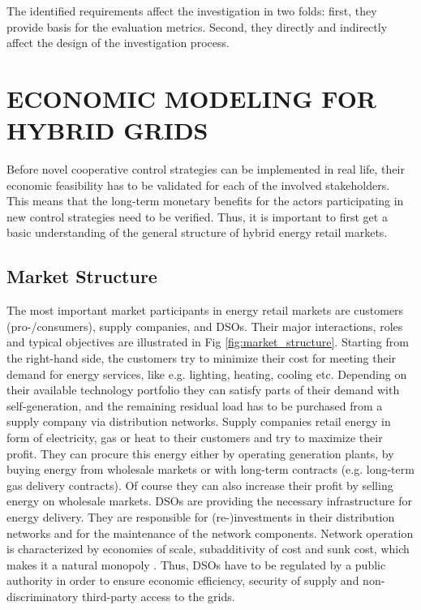 \documentclass[a4paper,twoside]{article}
\begin{document}
The identified requirements affect the investigation in two folds:
first, they provide basis for the evaluation metrics. Second, they
directly and indirectly affect the design of the investigation
process. 

     
\section{\uppercase{Economic Modeling for Hybrid Grids}}
\label{sec:econ} 
\noindent
Before novel cooperative control strategies can be implemented in real
life, their economic feasibility has to be validated for each of the
involved stakeholders. This means that the long-term monetary benefits
for the actors participating in new control strategies need to be
verified. Thus, it is important to first get a basic
understanding of the general structure of hybrid energy retail
markets.

\subsection{Market Structure}
\label{sec:econ-1}
\noindent
The most important market participants in energy retail markets are
customers (pro-/consumers), supply companies, and DSOs. Their
major interactions, roles and typical objectives are illustrated in
Fig  \ref{fig:market_structure}. 
Starting from the right-hand side, the customers try to minimize their
cost for meeting their demand for energy services, like e.g. lighting,
heating, cooling etc. Depending on their available technology
portfolio they can satisfy parts of their demand with self-generation,
and the remaining residual load has to be purchased from a supply
company via distribution networks. 
Supply companies retail energy in form of electricity, gas or heat to
their customers and try to maximize their profit. They can procure
this energy either by operating generation plants, by buying energy
from wholesale markets or with long-term contracts (e.g. long-term gas
delivery contracts). Of course they can also increase their profit by
selling energy on wholesale markets. 
DSOs are providing the necessary infrastructure for energy
delivery. They are responsible for (re-)investments in their
distribution networks and for the maintenance of the network
components. Network operation is characterized by economies of scale,
subadditivity of cost and sunk cost, which makes it a natural
monopoly \cite{auer_2011}. Thus, DSOs have to be regulated by a public
authority in order to ensure economic efficiency, security of supply
and non-discriminatory third-party access to the grids.  
\end{document}
